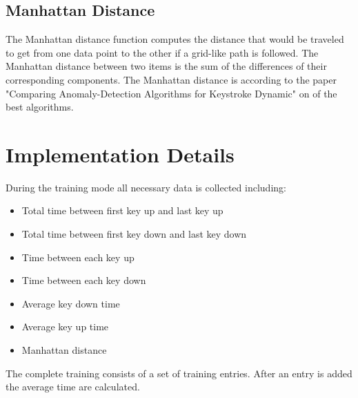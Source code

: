 \documentclass[fleqn,10pt]{SelfArx} %
\begin{document}
\subsection{Manhattan Distance}
The Manhattan distance function computes the distance that would be traveled to get from one data point to the other if a grid-like path is followed. The Manhattan distance between two items is the sum of the differences of their corresponding components\cite{manhattan}.
\newline
The Manhattan distance is according to the paper "Comparing Anomaly-Detection Algorithms for Keystroke Dynamic" \cite{Figueredo:2009dg} on of the best algorithms. 

\section{Implementation Details}
During the training mode all necessary data is collected including:
\begin{itemize}
  \item Total time between first key up and last key up
  \item Total time between first key down and last key down
  \item Time between each key up
  \item Time between each key down
  \item Average key down time
  \item Average key up time
  \item Manhattan distance
\end{itemize}
The complete training consists of a set of training entries. After an entry is added the average time are calculated.
\end{document}
